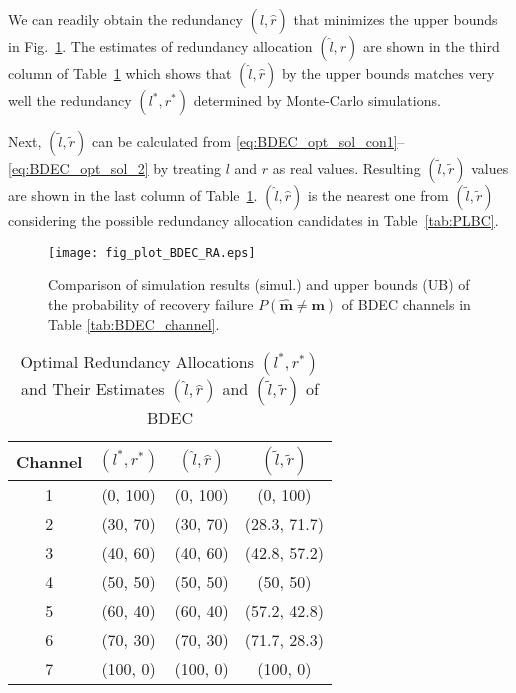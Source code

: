 \documentclass[10pt,twocolumn,twoside,submit]{JCNtran}
\begin{document}
	
	We can readily obtain the redundancy $(\widehat{l}, \widehat{r})$ that minimizes the upper bounds in Fig.~\ref{fig:plot_BDEC_RA}. The estimates of redundancy allocation $(\widehat{l}, \widehat{r})$ are shown in the third column of Table~\ref{tab:BDEC_redundancy} which shows that $(\widehat{l}, \widehat{r})$ by the upper bounds matches very well the redundancy $(l^*, r^*)$ determined by Monte-Carlo simulations.
	
	Next, $(\widetilde{l}, \widetilde{r})$ can be calculated from \eqref{eq:BDEC_opt_sol_con1}--\eqref{eq:BDEC_opt_sol_2} by treating $l$ and $r$ as real values. Resulting $(\widetilde{l}, \widetilde{r})$ values are shown in the last column of Table~\ref{tab:BDEC_redundancy}. $(\widehat{l}, \widehat{r} )$ is the nearest one from $(\widetilde{l}, \widetilde{r})$ considering the possible redundancy allocation candidates in Table~\ref{tab:PLBC}.	
	
	\begin{figure}[!t]
		\centering
		\texttt{[image: fig\_plot\_BDEC\_RA.eps]}
		\caption{Comparison of simulation results (simul.) and upper bounds (UB) of the probability of recovery failure $P(\widehat{\mathbf{m}} \ne \mathbf{m})$ of BDEC channels in Table \ref{tab:BDEC_channel}.}
		\label{fig:plot_BDEC_RA}
	\end{figure}	

	\begin{table}[t]
		\renewcommand{\arraystretch}{1.3}
		\caption{Optimal Redundancy Allocations $\left(l^*, r^*\right)$ and Their Estimates $(\widehat{l}, \widehat{r})$ and $(\widetilde{l}, \widetilde{r})$ of BDEC}
		\label{tab:BDEC_redundancy}
		\centering
		\small{
		\begin{tabular}{c|c|c|c}
			\hline
			Channel & {$\left(l^*, r^*\right)$} & {$(\widehat{l}, \widehat{r})$} & {$(\widetilde{l}, \widetilde{r})$}    \\ \hline \hline
			1 & (0, 100) & (0, 100) & (0, 100)      \\ \hline
			2 & (30, 70) & (30, 70) & (28.3, 71.7)  \\ \hline
			3 & (40, 60) & (40, 60) & (42.8, 57.2)  \\ \hline
			4 & (50, 50) & (50, 50) & (50, 50)  \\ \hline
			5 & (60, 40) & (60, 40) & (57.2, 42.8)  \\ \hline
			6 & (70, 30) & (70, 30) & (71.7, 28.3)  \\ \hline
			7 & (100, 0) & (100, 0) & (100, 0)      \\ \hline
		\end{tabular}}
		\vspace{-5mm}
	\end{table}
	
\end{document}
